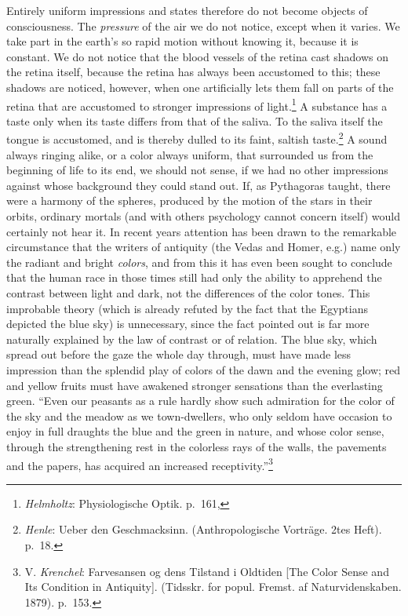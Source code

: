 \documentclass[12pt,a4paper]{book}
\newcommand{\opage}[1]{\marginnote{\footnotesize\textit{[#1]}}}
\begin{document}
\opage{140}Entirely uniform impressions and states therefore do not
become objects of consciousness. The \emph{pressure} of the air we do
not notice, except when it varies. We take part in the earth's so rapid
motion without knowing it, because it is constant. We do not notice that
the blood vessels of the retina cast shadows on the retina itself,
because the retina has always been accustomed to this; these shadows are
noticed, however, when one artificially lets them fall on parts of the
retina that are accustomed to stronger
impressions of light.\footnote{\emph{Helmholtz}: Physiologische Optik.
p.~161,} A substance has a taste only when its taste differs from that
of the saliva. To the saliva itself the tongue is accustomed, and is
thereby dulled to its faint,
saltish taste.\footnote{\emph{Henle}: Ueber den Geschmacksinn.
(Anthropologische Vorträge. 2tes Heft). p.~18.} A sound always ringing
alike, or a color always uniform, that surrounded us from the beginning
of life to its end, we should not sense, if we had no other impressions
against whose background they could stand out. If, as Pythagoras taught,
there were a harmony of the spheres, produced by the motion of the stars
in their orbits, ordinary mortals (and with others psychology cannot
concern itself) would certainly not hear it. In recent years attention
has been drawn to the remarkable circumstance that the writers of
antiquity (the Vedas and Homer, e.g.) name only the radiant and bright
\emph{colors}, and from this it has even been sought to conclude that
the human race in those times still had only the ability to apprehend
the contrast between light and dark, not the differences of the color
tones. This improbable theory (which is already refuted by the fact that
the Egyptians depicted the blue sky) is unnecessary, since the fact
pointed out is far more naturally explained by the law of contrast or
of relation. The blue sky, which spread out before the gaze the whole
day through, must have made less impression than the splendid play of
colors of the dawn and the evening glow; red and yellow fruits must have
awakened stronger sensations than the everlasting green. ``Even our
peasants as a rule hardly show such admiration for the color of the sky
and the meadow as we town-dwellers, who only seldom have occasion to
enjoy in full draughts the blue and the green in nature, and whose color
sense, through the strengthening rest in the colorless rays of the
walls, the pavements
\opage{141}and the papers, has acquired an increased
receptivity.''\footnote{V. \emph{Krenchel}: Farvesansen og dens
Tilstand i Oldtiden [The Color Sense and Its Condition in Antiquity].
(Tidsskr. for popul. Fremst. af Naturvidenskaben. 1879). p.~153.}
\end{document}
